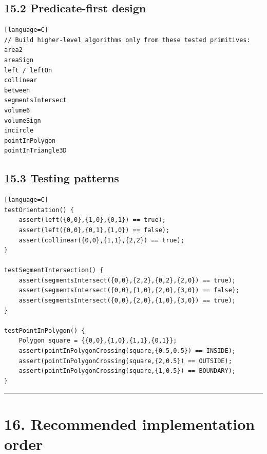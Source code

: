 \documentclass[11pt]{article}
\begin{document}
\subsection{15.2 Predicate-first design}\label{predicate-first-design}

\begin{verbatim}[language=C]
// Build higher-level algorithms only from these tested primitives:
area2
areaSign
left / leftOn
collinear
between
segmentsIntersect
volume6
volumeSign
incircle
pointInPolygon
pointInTriangle3D
\end{verbatim}

\subsection{15.3 Testing patterns}\label{testing-patterns}

\begin{verbatim}[language=C]
testOrientation() {
    assert(left({0,0},{1,0},{0,1}) == true);
    assert(left({0,0},{0,1},{1,0}) == false);
    assert(collinear({0,0},{1,1},{2,2}) == true);
}

testSegmentIntersection() {
    assert(segmentsIntersect({0,0},{2,2},{0,2},{2,0}) == true);
    assert(segmentsIntersect({0,0},{1,0},{2,0},{3,0}) == false);
    assert(segmentsIntersect({0,0},{2,0},{1,0},{3,0}) == true);
}

testPointInPolygon() {
    Polygon square = {{0,0},{1,0},{1,1},{0,1}};
    assert(pointInPolygonCrossing(square,{0.5,0.5}) == INSIDE);
    assert(pointInPolygonCrossing(square,{2,0.5}) == OUTSIDE);
    assert(pointInPolygonCrossing(square,{1,0.5}) == BOUNDARY);
}
\end{verbatim}

\begin{center}\rule{0.5\linewidth}{0.5pt}\end{center}

\section{16. Recommended implementation
order}\label{recommended-implementation-order}
\end{document}
